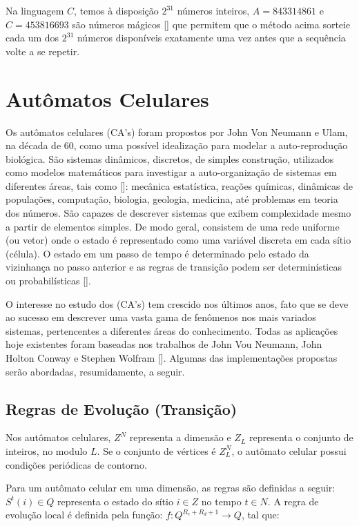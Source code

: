 \documentclass[brazil,ruledheader]{abnt}
\renewcommand{\cite}[1]{[\citeonline{#1}]}
\begin{document}
Na linguagem $C$, temos à disposição $2^{31}$ números inteiros, $A =
843314861$ e $C = 453816693$ são números mágicos \cite{St93} que permitem
que o método acima sorteie cada um dos $2^{31}$ números disponíveis
exatamente uma vez antes que a sequência volte a se repetir.

\section{Autômatos Celulares}

Os autômatos celulares (CA's) foram propostos por John Von Neumann e Ulam, na
década
de 60, como uma possível idealização para modelar a auto-reprodução
biológica. São sistemas dinâmicos, discretos, de simples construção, utilizados
como  modelos matemáticos para investigar a auto-organização de sistemas
em diferentes áreas, tais como \cite{Fa02,Bo04,Wo83}: mecânica
estatística, reações químicas, dinâmicas de populações, computação, biologia,
geologia, medicina, até problemas em teoria dos números. São capazes de
descrever sistemas que exibem complexidade mesmo a partir de elementos
simples. De modo geral, consistem de uma rede uniforme (ou vetor) onde o
estado é representado como uma variável discreta em cada sítio (célula). O
estado em um passo de tempo é determinado pelo estado da vizinhança no
passo anterior e as regras de transição podem ser determinísticas
ou probabilísticas \cite{Fa02,Wo83}. 

O interesse no estudo dos (CA's) tem crescido nos últimos anos, fato que
se deve ao sucesso em descrever uma vasta gama de fenômenos nos mais
variados sistemas, pertencentes a diferentes áreas do conhecimento. Todas as
aplicações  hoje existentes foram baseadas nos trabalhos de John Vou
Neumann, John Holton Conway e Stephen Wolfram \cite{CaCa08}. Algumas das
implementações propostas serão abordadas, resumidamente, a seguir.

\subsection{Regras de Evolução (Transição)}

Nos autômatos celulares, $Z^N$ representa a dimensão e $Z_L$ representa
o conjunto de inteiros, no modulo $L$. Se o conjunto de vértices é $Z^N_L$, o
autômato celular possui condições periódicas de contorno.

Para um autômato celular em uma dimensão, as regras são definidas a seguir:
$S^t(i) \in Q$ representa o estado do sítio $i \in Z$ no tempo $t \in N$. A
regra de evolução local é definida pela função: $f: Q^{R_e+R_d+1} \rightarrow
Q$, tal que: 
\end{document}
